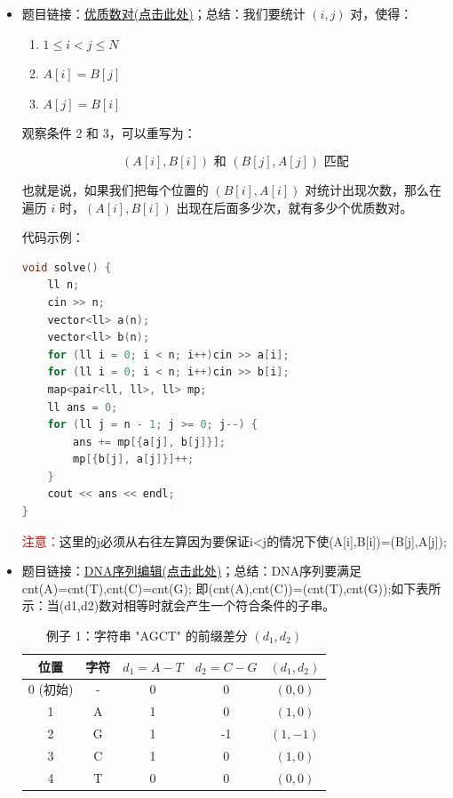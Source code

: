 \begin{itemize}
\subsubsection{哈希表解决数对问题}
\item 题目链接：\href{http://lanqiao.cn/problems/3877}{优质数对(点击此处)}；总结：我们要统计 $(i, j)$ 对，使得：

\begin{enumerate}
	\item $1 \le i < j \le N$
	\item $A[i] = B[j]$
	\item $A[j] = B[i]$
\end{enumerate}

观察条件 2 和 3，可以重写为：

\[
(A[i], B[i]) \text{ 和 } (B[j], A[j]) \text{ 匹配}
\]

也就是说，如果我们把每个位置的 $(B[i], A[i])$ 对统计出现次数，那么在遍历 $i$ 时，$(A[i], B[i])$ 出现在后面多少次，就有多少个优质数对。

代码示例：\\
\begin{lstlisting}[language=C++]
void solve() {
	ll n;
	cin >> n;
	vector<ll> a(n);
	vector<ll> b(n);
	for (ll i = 0; i < n; i++)cin >> a[i];
	for (ll i = 0; i < n; i++)cin >> b[i];
	map<pair<ll, ll>, ll> mp;
	ll ans = 0;
	for (ll j = n - 1; j >= 0; j--) {
		ans += mp[{a[j], b[j]}];
		mp[{b[j], a[j]}]++;
	}
	cout << ans << endl;
}
\end{lstlisting}
\textcolor{red}{注意：}这里的j必须从右往左算因为要保证i<j的情况下使(A[i],B[i])=(B[j],A[j]);

\item 题目链接：\href{https://www.luogu.com.cn/problem/AT_arc104_b}{DNA序列编辑(点击此处)}；总结：DNA序列要满足cnt(A)=cnt(T),cnt(C)=cnt(G);
即(cnt(A),cnt(C))=(cnt(T),cnt(G));如下表所示：当(d1,d2)数对相等时就会产生一个符合条件的子串。

\begin{table}[h!]
	\centering
	\begin{tabular}{|c|c|c|c|c|}
		\hline
		位置 & 字符 & $d_1 = A - T$ & $d_2 = C - G$ & $(d_1, d_2)$ \\
		\hline
		0 (初始) & - & 0 & 0 & $(0,0)$ \\
		\hline
		1 & A & 1 & 0 & $(1,0)$ \\
		\hline
		2 & G & 1 & -1 & $(1,-1)$ \\
		\hline
		3 & C & 1 & 0 & $(1,0)$ \\
		\hline
		4 & T & 0 & 0 & $(0,0)$ \\
		\hline
	\end{tabular}
	\caption{例子 1：字符串 "AGCT" 的前缀差分 $(d_1,d_2)$}
\end{table}


\end{itemize}
